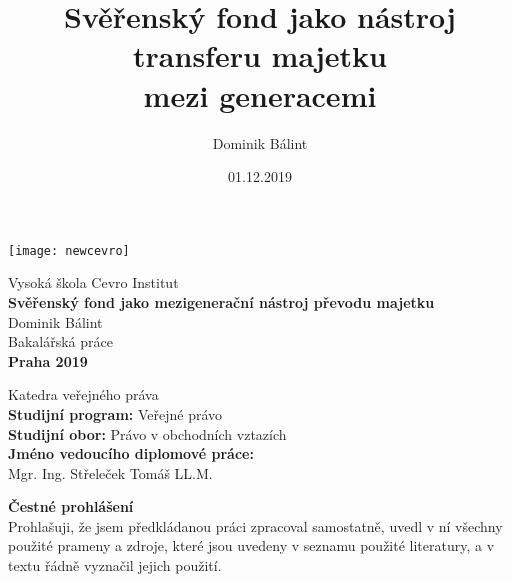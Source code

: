 \documentclass{article}
\begin{document}
\title{Svěřenský fond jako nástroj transferu majetku\\ mezi generacemi}
\author{Dominik Bálint}
\date{01.12.2019}

  \thispagestyle{empty}
  \begin{center}
  \texttt{[image: newcevro]} \\
  \end{center}
  \vspace{15mm}
  \begin{center}
  {\Large Vysoká škola Cevro Institut} \\
  \vspace{15mm}
  {\Large \textbf{Svěřenský fond jako mezigenerační nástroj převodu majetku}} \\
  \vspace{15mm}
  {\Large Dominik Bálint} \\
  \vspace{15mm}
  {\Large Bakalářská práce} \\
  \vspace{49mm}
  {\Large \textbf{Praha 2019}} \\
  \end{center}
  
\newpage
  \thispagestyle{empty}
  \maketitle
  \begin{center}
  {\Large Katedra veřejného práva} \\	
  \vspace{15mm}
  {\Large \textbf{Studijní program:} Veřejné právo} \\
  {\Large \textbf{Studijní obor:} Právo v obchodních vztazích} \\
  {\Large \textbf{Jméno vedoucího diplomové práce:} } \\
  {\Large Mgr. Ing.  Střeleček  Tomáš LL.M.} \\
  \end{center}
  
\newpage
  \thispagestyle{empty}
  \vspace*{\fill}

\noindent \textbf{Čestné prohlášení} \\

Prohlašuji, že jsem předkládanou práci zpracoval samostatně, uvedl
v ní všechny použité prameny a zdroje, které jsou uvedeny v seznamu použité
literatury, a v textu řádně vyznačil jejich použití. \\
\end{document}
